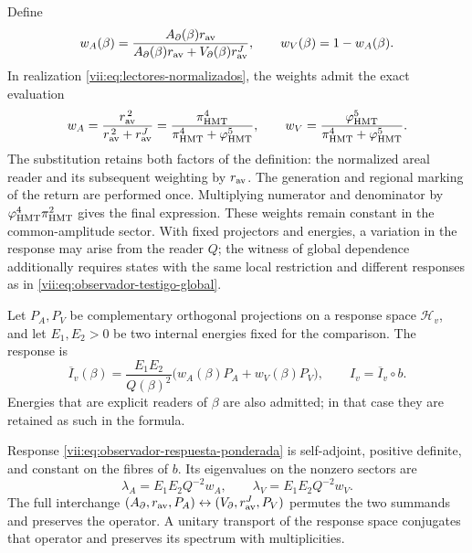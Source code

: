 Define
\[
 w_A(\beta)=
 \frac{A_\partial(\beta)r_{\rm av}}
 {A_\partial(\beta)r_{\rm av}+V_\partial(\beta)r_{\rm av}^{J}},
 \qquad w_V(\beta)=1-w_A(\beta).
\]
In realization \eqref{vii:eq:lectores-normalizados}, the weights
admit the exact evaluation
\begin{equation}
 w_A=\frac{r_{\rm av}^{\,2}}{r_{\rm av}^{\,2}+r_{\rm av}^{J}}
     =\frac{\pi_{\rm HMT}^{4}}
            {\pi_{\rm HMT}^{4}+\varphi_{\rm HMT}^{5}},\qquad
 w_V=\frac{\varphi_{\rm HMT}^{5}}
            {\pi_{\rm HMT}^{4}+\varphi_{\rm HMT}^{5}}.
 \label{vii:eq:pesos-amplitud-comun}
\end{equation}
The substitution retains both factors of the definition: the normalized
areal reader and its subsequent weighting by \(r_{\rm av}\).
The generation and regional marking of the return are performed once.
Multiplying numerator
and denominator by \(\varphi_{\rm HMT}^4\pi_{\rm HMT}^2\)
gives the final expression. These weights remain constant in the
common-amplitude sector. With fixed projectors and energies, a
variation in the response may arise from the reader \(Q\);
the witness of global dependence additionally requires states with
the same local restriction and different responses as in
\eqref{vii:eq:observador-testigo-global}.


Let \(P_A,P_V\) be complementary orthogonal projections on a
response space \(\mathcal H_v\), and let \(E_1,E_2>0\) be
two internal energies fixed for the comparison. The response is
\begin{equation}
 \overline I_v(\beta)=\frac{E_1E_2}{Q(\beta)^2}
       \bigl(w_A(\beta)P_A+w_V(\beta)P_V\bigr),
 \qquad I_v=\overline I_v\circ b.
 \label{vii:eq:observador-respuesta-ponderada}
\end{equation}
Energies that are explicit readers of
\(\beta\) are also admitted; in that case they are retained as such in the formula.

\begin{proposition}
\label{vii:prop:observador-respuesta-positiva}
Response \eqref{vii:eq:observador-respuesta-ponderada} is
self-adjoint, positive definite, and constant on the fibres of \(b\).
Its eigenvalues on the nonzero sectors are
\[
 \lambda_A=E_1E_2Q^{-2}w_A,\qquad
 \lambda_V=E_1E_2Q^{-2}w_V.
\]
The full interchange
\((A_\partial,r_{\rm av},P_A)
 \leftrightarrow(V_\partial,r_{\rm av}^{J},P_V)\)
permutes the two summands and preserves the operator. A unitary
transport of the response space conjugates that operator and preserves
its spectrum with multiplicities.
\end{proposition}

